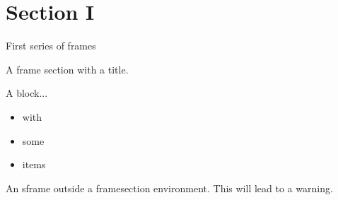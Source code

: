 \documentclass{beamer}
\begin{document}
\section*{Section I}

\begin{framesection}{First series of frames}
  \begin{sframe}
    A frame section with a title.
  \end{sframe}

  \begin{sframe}
    \begin{block}{A block...}
        \begin{itemize}
          \item with 
          \item some
          \item items
        \end{itemize}
    \end{block}
  \end{sframe}

\end{framesection}

\begin{sframe}
  An sframe outside a framesection environment.
  This will lead to a warning.
\end{sframe}
\end{document}

